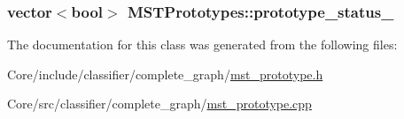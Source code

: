 \hypertarget{classMSTPrototypes_af2f3546aaad6bce57f5b9db34f38be37}{
\subsubsection[{prototype\+\_\+status\+\_\+}]{\setlength{\rightskip}{0pt plus 5cm}vector$<$bool$>$ M\+S\+T\+Prototypes\+::prototype\+\_\+status\+\_\+\hspace{0.3cm}{\ttfamily [private]}}}\label{classMSTPrototypes_af2f3546aaad6bce57f5b9db34f38be37}


The documentation for this class was generated from the following files\+:\begin{DoxyCompactItemize}
\item 
Core/include/classifier/complete\+\_\+graph/\hyperlink{mst__prototype_8h}{mst\+\_\+prototype.\+h}\item 
Core/src/classifier/complete\+\_\+graph/\hyperlink{mst__prototype_8cpp}{mst\+\_\+prototype.\+cpp}\end{DoxyCompactItemize}
